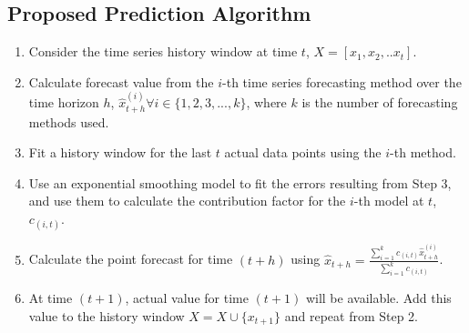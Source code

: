 \subsection{Proposed Prediction Algorithm}
\begin{enumerate}
\item Consider the time series history window at time $t$, $X=[x_{1},x_{2},.. x_{t}]$.
\item Calculate forecast value from the $i$-th time series forecasting method over the time horizon $h$, $\hat{x}_{t+h}^{(i)} \forall i \in \{1,2,3,...,k\}$, where $k$ is the number of forecasting methods used.
\item Fit a history window for the last $t$ actual data points using the $i$-th method.
\item Use an exponential smoothing model to fit the errors resulting from Step 3, and use them to calculate the contribution factor for the $i$-th model at $t$, $c_{(i,t)}$.
\item Calculate the point forecast for time $(t+h)$ using
$\hat{x}_{t+h}= \frac{\sum_{i=1}^{k}c_{(i,t)} \hat{x}_{t+h}^{(i)}}{\sum_{i=1}^{k}c_{(i,t)}}$.
\item At time $(t+1)$, actual value for time $(t+1)$ will be available. Add this value to the history window $X=X\cup \{x_{t+1}\}$ and repeat from Step 2.
\end{enumerate}
